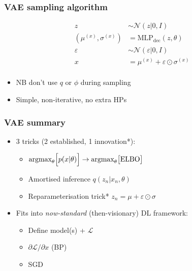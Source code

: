 \documentclass[xcolor=table,dvipsnames]{beamer}
\begin{document}
\begin{frame}
    \frametitle{VAE sampling algorithm}
    \begin{align*}
        z&\sim \mathcal{N}(z\vert 0, I) \tag{Sample latent from prior} \\
        \left(\mu^{(x)}, \sigma^{(x)}\right) &= \text{MLP}_\text{dec}(z, \theta) \tag{Decoder forward} \\
        \varepsilon &\sim \mathcal{N}(\varepsilon \vert 0, I) \tag{Auxiliary noise samples} \\
        x &= \mu^{(x)} + \varepsilon \odot \sigma^{(x)} \tag{Reparameterise} \\
    \end{align*}
    \vfill
    \begin{itemize}
        \setlength{\itemsep}{1em}
        \item NB don't use $q$ or $\phi$ during sampling
        \item Simple, non-iterative, no extra HPs
    \end{itemize}
\end{frame}

\begin{frame}
    \frametitle{VAE summary}
    \begin{itemize}
        \setlength{\itemsep}{1em}
        \item 3 tricks (2 established, 1 innovation*):
        \begin{itemize}
            \setlength{\itemsep}{0.5em}
            \vspace{0.5em}
            \item $\text{argmax}_\theta\Bigl[p(x|\theta)\Bigr] \rightarrow \text{argmax}_\theta\bigl[\text{ELBO}\bigr]$
            \item Amortised inference $q(z_n | x_n, \theta)$
            \item Reparameterisation trick* $z_n = \mu + \varepsilon \odot \sigma$
        \end{itemize}
        \item Fits into \emph{now-standard} (then-visionary) DL framework:
        \begin{itemize}
            \setlength{\itemsep}{0.5em}
            \vspace{0.5em}
            \item Define model(s) + $\mathcal{L}$
            \item $\partial\mathcal{L}/\partial x$ (BP)
            \item SGD
        \end{itemize}
    \end{itemize}
\end{frame}
\end{document}
